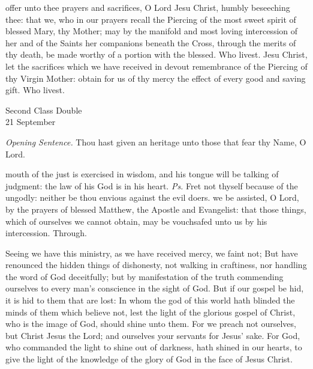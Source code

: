 \secret
{} offer unto thee prayers and sacrifices, O Lord Jesu Christ, humbly beseeching thee: that we, who in our prayers recall the Piercing of the most sweet spirit of blessed Mary, thy Mother; may by the manifold and most loving intercession of her and of the Saints her companions beneath the Cross, through the merits of thy death, be made worthy of a portion with the blessed. Who livest.
\postcommunion
{} Jesu Christ, let the sacrifices which we have received in devout remembrance of the Piercing of thy Virgin Mother: obtain for us of thy mercy the effect of every good and saving gift. Who livest.


\begin{inhead}
    {Second Class Double\\
21 September}
\end{inhead}
\par\noindent
\textit{Opening Sentence.} Thou hast given an heritage unto those that fear thy Name, O Lord.%

\introit
{} mouth of the just is exercised in wisdom, and his tongue will be talking of judgment: the law of his God is in his heart. \textit{Ps.} Fret not thyself because of the ungodly: neither be thou envious against the evil doers.
\collect
 we be assisted, O Lord, by the prayers of blessed Matthew, the Apostle and Evangelist: that those things, which of ourselves we cannot obtain, may be vouchsafed unto us by his intercession. Through.

 Seeing we have this ministry, as we have received mercy, we faint not; But have renounced the hidden things of dishonesty, not walking in craftiness, nor handling the word of God deceitfully; but by manifestation of the truth commending ourselves to every man's conscience in the sight of God. But if our gospel be hid, it is hid to them that are lost: In whom the god of this world hath blinded the minds of them which believe not, lest the light of the glorious gospel of Christ, who is the image of God, should shine unto them. For we preach not ourselves, but Christ Jesus the Lord; and ourselves your servants for Jesus' sake. For God, who commanded the light to shine out of darkness, hath shined in our hearts, to give the light of the knowledge of the glory of God in the face of Jesus Christ.


